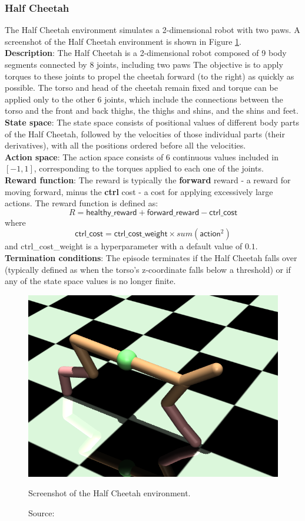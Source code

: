 \subsubsection{Half Cheetah}

The Half Cheetah environment \cite{halfcheetahfarama} 
simulates a 2-dimensional robot with two paws.
A screenshot of the Half Cheetah environment is shown
in Figure \ref{fig:halfcheetah}.\\
\textbf{Description}: The Half Cheetah is a 2-dimensional robot
composed of 9 body segments connected by 8 joints, including two paws
The objective is to apply torques to these joints to propel the
cheetah forward (to the right) as quickly as possible.
The torso and head of the cheetah remain fixed
and torque can be applied only to the other 6 joints,
which include the connections between the torso and
the front and back thighs, the thighs and shins, and the shins and feet.\\
\textbf{State space}: The state space consists of positional values
of different body parts of the Half Cheetah, followed by the velocities
of those individual parts (their derivatives), with all the positions
ordered before all the velocities.\\
\textbf{Action space}: The action space consists of $6$ continuous values
included in $[-1, 1]$,
corresponding to the torques applied to each one of the joints.\\
\textbf{Reward function}: The reward is typically
 the \textbf{forward} reward
- a reward for moving forward, minus the \textbf{ctrl} cost
- a cost for applying excessively large actions.
The reward function is defined as:
\begin{equation}
    R = \textsf{healthy\_reward} + \textsf{forward\_reward} - \textsf{ctrl\_cost}
\end{equation}
where
\begin{equation}
    \textsf{ctrl\_cost} = \textsf{ctrl\_cost\_weight} \times sum(\textsf{action}^2)
\end{equation}
and \textsf{ctrl\_cost\_weight} is a hyperparameter with a default value of $0.1$.\\
\textbf{Termination conditions}: The episode terminates if the
Half Cheetah falls over
(typically defined as when the torso's z-coordinate falls below a threshold)
or if any of the state space values is no longer finite.

\begin{figure}[h]
    \centering
    \includegraphics[width=.4\textwidth]{figures/ch4/halfcheetah.png}
    \caption{Screenshot of the Half Cheetah environment.}
    \vspace{-10px}
    \caption*{\scriptsize{Source: \cite{halfcheetahpic}}}
    \label{fig:halfcheetah}
\end{figure}

